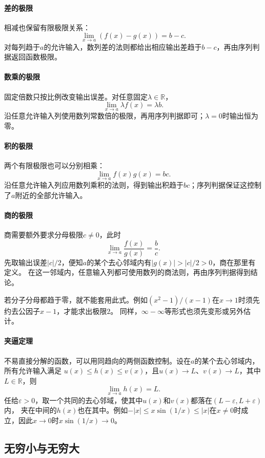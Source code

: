 \paragraph{差的极限}
相减也保留有限极限关系：
\[
 \lim_{x\to a}(f(x)-g(x))=b-c.
\]
对每列趋于$a$的允许输入，数列差的法则都给出相应输出差趋于$b-c$，再由序列判据返回函数极限。

\paragraph{数乘的极限}
固定倍数只按比例改变输出误差。对任意固定$\lambda\in\mathbb R$，
\[
 \lim_{x\to a}\lambda f(x)=\lambda b.
\]
沿任意允许输入列使用数列常数倍的极限，再用序列判据即可；$\lambda=0$时输出恒为零。

\paragraph{积的极限}
两个有限极限也可以分别相乘：
\[
 \lim_{x\to a}f(x)g(x)=bc.
\]
沿任意允许输入列应用数列乘积的法则，得到输出积趋于$bc$；序列判据保证这控制了$a$附近的全部允许输入。

\paragraph{商的极限}
商需要额外要求分母极限$c\neq0$，此时
\[
 \lim_{x\to a}\frac{f(x)}{g(x)}=\frac bc.
\]
先取输出误差$|c|/2$，便知$a$的某个去心邻域内有$|g(x)|>|c|/2>0$，商在那里有定义。
在这一邻域内，任意输入列都可使用数列的商法则，再由序列判据得到结论。

若分子分母都趋于零，就不能套用此式。例如$(x^2-1)/(x-1)$在$x\to1$时须先约去公因子$x-1$，才能求出极限$2$。
同样，$\infty-\infty$等形式也须先变形或另外估计。

\paragraph{夹逼定理}
不易直接分解的函数，可以用同趋向的两侧函数控制。设在$a$的某个去心邻域内，所有允许输入满足
$u(x)\leq h(x)\leq v(x)$，且$u(x)\to L$、$v(x)\to L$，其中$L\in\mathbb R$，则
\[
 \lim_{x\to a}h(x)=L.
\]
任给$\varepsilon>0$，取一个共同的去心邻域，使其中$u(x)$和$v(x)$都落在$(L-\varepsilon,L+\varepsilon)$内，
夹在中间的$h(x)$也在其中。例如$-|x|\leq x\sin(1/x)\leq|x|$在$x\neq0$时成立，因此$x\to0$时$x\sin(1/x)\to0$。

\subsection{无穷小与无穷大}

